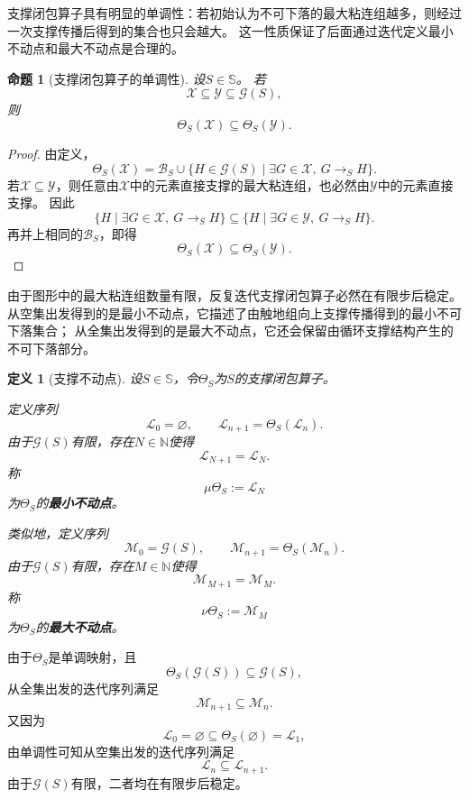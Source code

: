 \documentclass[UTF8,fontset=none]{ctexart}
\theoremstyle{cnthm}
\newtheorem{definition}{定义}[section]
\newtheorem{proposition}{命题}[section]
\begin{document}
			支撑闭包算子具有明显的单调性：若初始认为不可下落的最大粘连组越多，则经过一次支撑传播后得到的集合也只会越大。
			这一性质保证了后面通过迭代定义最小不动点和最大不动点是合理的。
			
			\begin{proposition}[支撑闭包算子的单调性]
				设$S\in\mathbb{S}$。
				若
				$$
				\mathcal{X}\subseteq \mathcal{Y}\subseteq \mathcal{G}(S),
				$$
				则
				$$
				\Theta_S(\mathcal{X})\subseteq \Theta_S(\mathcal{Y}).
				$$
			\end{proposition}
			
			\begin{proof}
				由定义，
				$$
				\Theta_S(\mathcal{X})
				=
				\mathcal{B}_S
				\cup
				\{H\in\mathcal{G}(S)\mid \exists G\in\mathcal{X},\ G\to_S H\}.
				$$
				若$\mathcal{X}\subseteq\mathcal{Y}$，则任意由$\mathcal{X}$中的元素直接支撑的最大粘连组，也必然由$\mathcal{Y}$中的元素直接支撑。
				因此
				$$
				\{H\mid \exists G\in\mathcal{X},\ G\to_S H\}
				\subseteq
				\{H\mid \exists G\in\mathcal{Y},\ G\to_S H\}.
				$$
				再并上相同的$\mathcal{B}_S$，即得
				$$
				\Theta_S(\mathcal{X})\subseteq \Theta_S(\mathcal{Y}).
				$$
			\end{proof}
			
			由于图形中的最大粘连组数量有限，反复迭代支撑闭包算子必然在有限步后稳定。
			从空集出发得到的是最小不动点，它描述了由触地组向上支撑传播得到的最小不可下落集合；
			从全集出发得到的是最大不动点，它还会保留由循环支撑结构产生的不可下落部分。
			
			\begin{definition}[支撑不动点]
				设$S\in\mathbb{S}$，令$\Theta_S$为$S$的支撑闭包算子。
				
				定义序列
				$$
				\mathcal{L}_0=\varnothing,
				\qquad
				\mathcal{L}_{n+1}=\Theta_S(\mathcal{L}_n).
				$$
				由于$\mathcal{G}(S)$有限，存在$N\in\mathbb{N}$使得
				$$
				\mathcal{L}_{N+1}=\mathcal{L}_N.
				$$
				称
				$$
				\mu\Theta_S:=\mathcal{L}_N
				$$
				为$\Theta_S$的\textbf{最小不动点}。
				
				类似地，定义序列
				$$
				\mathcal{M}_0=\mathcal{G}(S),
				\qquad
				\mathcal{M}_{n+1}=\Theta_S(\mathcal{M}_n).
				$$
				由于$\mathcal{G}(S)$有限，存在$M\in\mathbb{N}$使得
				$$
				\mathcal{M}_{M+1}=\mathcal{M}_M.
				$$
				称
				$$
				\nu\Theta_S:=\mathcal{M}_M
				$$
				为$\Theta_S$的\textbf{最大不动点}。
			\end{definition}
			
			由于$\Theta_S$是单调映射，且
			$$
			\Theta_S(\mathcal{G}(S))\subseteq\mathcal{G}(S),
			$$
			从全集出发的迭代序列满足
			$$
			\mathcal{M}_{n+1}\subseteq\mathcal{M}_n.
			$$
			又因为
			$$
			\mathcal{L}_0=\varnothing\subseteq\Theta_S(\varnothing)=\mathcal{L}_1,
			$$
			由单调性可知从空集出发的迭代序列满足
			$$
			\mathcal{L}_n\subseteq\mathcal{L}_{n+1}.
			$$
			由于$\mathcal{G}(S)$有限，二者均在有限步后稳定。
			
\end{document}
